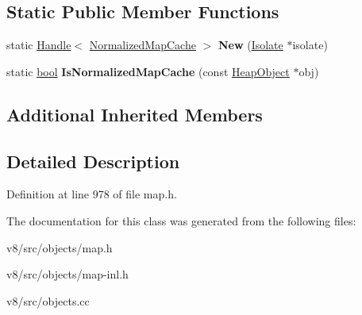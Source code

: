 \subsection*{Static Public Member Functions}
\begin{DoxyCompactItemize}
\item 
\mbox{\label{classv8_1_1internal_1_1NormalizedMapCache_a0dcfd10a848e942ed4032e7855365bbe}} 
static \mbox{\hyperlink{classv8_1_1internal_1_1Handle}{Handle}}$<$ \mbox{\hyperlink{classv8_1_1internal_1_1NormalizedMapCache}{Normalized\+Map\+Cache}} $>$ {\bfseries New} (\mbox{\hyperlink{classv8_1_1internal_1_1Isolate}{Isolate}} $\ast$isolate)
\item 
\mbox{\label{classv8_1_1internal_1_1NormalizedMapCache_a9fe7a07799b3a44e8b9612baba5ac990}} 
static \mbox{\hyperlink{classbool}{bool}} {\bfseries Is\+Normalized\+Map\+Cache} (const \mbox{\hyperlink{classv8_1_1internal_1_1HeapObject}{Heap\+Object}} $\ast$obj)
\end{DoxyCompactItemize}
\subsection*{Additional Inherited Members}


\subsection{Detailed Description}


Definition at line 978 of file map.\+h.



The documentation for this class was generated from the following files\+:\begin{DoxyCompactItemize}
\item 
v8/src/objects/map.\+h\item 
v8/src/objects/map-\/inl.\+h\item 
v8/src/objects.\+cc\end{DoxyCompactItemize}
